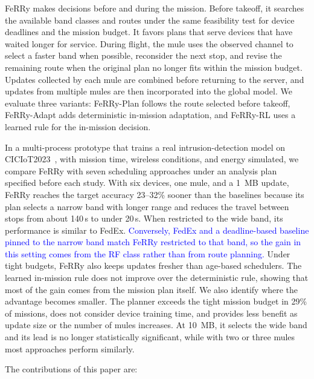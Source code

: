 \documentclass[conference]{IEEEtran}
\newcommand{\sysname}{FeRRy}
\begin{document}
\sysname{} makes decisions before and during the mission. Before takeoff, it
searches the available band classes and routes under the same feasibility test
for device deadlines and the mission budget. It favors plans that serve devices
that have waited longer for service. During flight, the mule uses the observed
channel to select a faster band when possible, reconsider the next stop, and
revise the remaining route when the original plan no longer fits within the
mission budget. Updates collected by each mule are combined before returning to
the server, and updates from multiple mules are then incorporated into the
global model. We evaluate three variants: FeRRy-Plan follows the route selected
before takeoff, FeRRy-Adapt adds deterministic in-mission adaptation, and
FeRRy-RL uses a learned rule for the in-mission decision.

In a multi-process prototype that trains a real intrusion-detection model on
CICIoT2023~\cite{CiCIoT2023}, with mission time, wireless conditions, and energy
simulated, we compare \sysname{} with seven scheduling approaches under an
analysis plan specified before each study. With six devices, one mule, and a
1~MB update, \sysname{} reaches the target accuracy 23--32\% sooner than the
baselines because its plan selects a narrow band with longer range and reduces
the travel between stops from about 140\,s to under 20\,s. When restricted to
the wide band, its performance is similar to FedEx. \textcolor{blue}{Conversely, FedEx and a deadline-based baseline pinned to the narrow band match
\sysname{} restricted to that band, so the gain in this setting comes from the RF
class rather than from route planning.} Under tight budgets,
\sysname{} also keeps updates fresher than age-based schedulers. The learned
in-mission rule does not improve over the deterministic rule, showing that most
of the gain comes from the mission plan itself. We also identify where the
advantage becomes smaller. The planner exceeds the tight mission budget in
29\% of missions, does not consider device training time, and provides less
benefit as update size or the number of mules increases. At 10~MB, it selects
the wide band and its lead is no longer statistically significant, while with
two or three mules most approaches perform similarly.

The contributions of this paper are:
\end{document}
